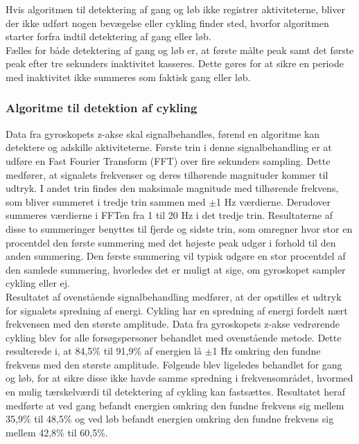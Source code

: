 Hvis algoritmen til detektering af gang og løb ikke registrer aktiviteterne, bliver der ikke udført nogen bevægelse eller cykling finder sted, hvorfor algoritmen starter forfra indtil detektering af gang eller løb. \\
Fælles for både detektering af gang og løb er, at første målte peak samt det første peak efter tre sekunders inaktivitet kasseres. Dette gøres for at sikre en periode med inaktivitet ikke summeres som faktisk gang eller løb.

\subsubsection{Algoritme til detektion af cykling}
Data fra gyroskopets z-akse skal signalbehandles, førend en algoritme kan detektere og adskille aktiviteterne. Første trin i denne signalbehandling er at udføre en Fast Fourier Transform (FFT) over fire sekunders sampling. Dette medfører, at signalets frekvenser og deres tilhørende magnituder kommer til udtryk. I andet trin findes den maksimale magnitude med tilhørende frekvens, som bliver summeret i tredje trin sammen med $\pm$1 Hz værdierne. Derudover %
summeres værdierne i FFTen fra 1 til 20 Hz i det tredje trin. Resultaterne af disse to summeringer benyttes til fjerde og sidste trin, som omregner hvor stor en procentdel den første summering med det højeste peak udgør i forhold til den anden summering. Den første summering vil typisk udgøre en stor procentdel af den samlede summering, hvorledes det er muligt at sige, om gyroskopet sampler cykling eller ej.\\
Resultatet af ovenstående signalbehandling medfører, at der opstilles et udtryk for signalets spredning af energi. Cykling har en spredning af energi fordelt nært frekvensen med den største amplitude. Data fra gyroskopets z-akse vedrørende cykling blev for alle forsøgspersoner behandlet med ovenstående metode. Dette resulterede i, at 84,5\% til 91,9\% af energien lå $\pm$1 Hz omkring den fundne frekvens med den største amplitude. Følgende blev ligeledes behandlet for gang og løb, for at sikre disse ikke havde samme spredning i frekvensområdet, hvormed en mulig tærskelværdi til detektering af cykling kan fastsættes. Resultatet heraf medførte at ved gang befandt energien omkring den fundne frekvens sig mellem 35,9\% til 48,5\% og ved løb befandt energien omkring den fundne frekvens sig mellem 42,8\% til 60,5\%. \\
